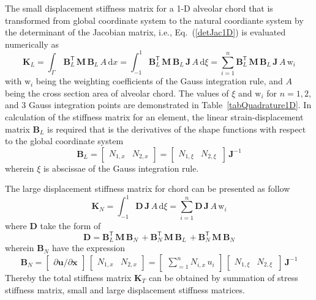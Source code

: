 The small displacement stiffness matrix for a 1-D alveolar chord that is transformed from global coordinate system to the natural coordiante system by the determinant of the Jacobian matrix, i.e., Eq.~(\ref{detJac1D}) is evaluated numerically as 
\begin{equation}
\mathbf{K}_{L} = \int_{\Gamma} \, \mathbf{B}_L^{\mathsf{T}} \, \mathbf{M} \, \mathbf{B}_L \, A \, \mathrm{d} x  = \int_{-1}^{1} \mathbf{B}_L^{\mathsf{T}} \, \mathbf{M} \, \mathbf{B}_L \, \mathbf{J}  \, A \,  \mathrm{d} \xi =  \sum_{i=1}^{n}  \mathbf{B}_L^{\mathsf{T}} \, \mathbf{M} \, \mathbf{B}_L \, \mathbf{J} \, A \, \mathrm{w}_i
\end{equation}
with $\mathrm{w}_i$ being the  weighting coefficients of the Gauss integration rule, and $A$ being the cross section area of alveolar chord. The values of $\xi$ and $\mathrm{w}_i$ for $n = 1, 2$, and $3$ Gauss integration points are demonstrated in Table~\ref{tabQuadrature1D}.
In calculation of the stiffness matrix for an element, the linear strain-displacement matrix $\mathbf{B}_L$ is required that is the derivatives of the shape functions with respect to the global coordinate system  
\begin{equation}
\mathbf{B}_L = \begin{bmatrix}
 N_{1,x} &   N_{2,x}
\end{bmatrix} = \begin{bmatrix}
 N_{1,\xi} &   N_{2,\xi} \, 
\end{bmatrix} \, \mathbf{J}^{-1}
\end{equation}
wherein $\xi$ is abscissae of the Gauss integration rule. 

The large displacement stiffness matrix for chord can be presented as follow
\begin{equation}
\mathbf{K}_{N} = \int_{-1}^{1} \mathbf{D} \, \mathbf{J}  \, A \,  \mathrm{d} \xi 
= \sum_{i=1}^{n} \mathbf{D} \, \mathbf{J} \, A \, \mathrm{w}_i
\end{equation}
where $\mathbf{D}$ take the form of
\begin{equation}
\mathbf{D} = \mathbf{B}_L^{\mathsf{T}} \, \mathbf{M} \, \mathbf{B}_N \, + \mathbf{B}_N^{\mathsf{T}} \, \mathbf{M} \, \mathbf{B}_L \, + \mathbf{B}_N^{\mathsf{T}} \, \mathbf{M} \, \mathbf{B}_N 
\end{equation}
wherein $\mathbf{B}_N$ have the expression 
\begin{equation}
\mathbf{B}_{N} =  \begin{bmatrix}
\partial \mathbf{u} / \partial \mathbf{x} 
\end{bmatrix} \, \begin{bmatrix}
 N_{1,x} &  N_{2,x}
\end{bmatrix} = \begin{bmatrix}
\sum\nolimits_{=1}^n N_{i,x} \, u_i
\end{bmatrix} \, \begin{bmatrix}
 N_{1,\xi} &   N_{2,\xi} \, 
\end{bmatrix} \, \mathbf{J}^{-1} 
\end{equation}
Thereby the total stiffness matrix $\mathbf{K}_T$ can be obtained by summation of stress stiffness matrix, small and large displacement stiffness matrices.

